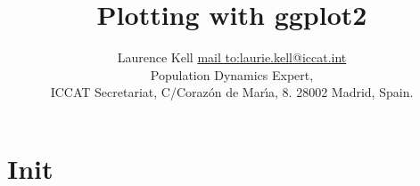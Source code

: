\documentclass[a4paper,10pt]{article}
\begin{document}
\title{\huge{Plotting with ggplot2}}
\author{Laurence Kell \href{laurie.kell@iccat.int}{mail to:laurie.kell@iccat.int}\\
Population Dynamics Expert, \\
ICCAT Secretariat, C/Coraz\'{o}n de Mar\'{\i}a, 8. 28002 Madrid, Spain.}
\date{}
\maketitle


\section*{Init}
\end{document}
